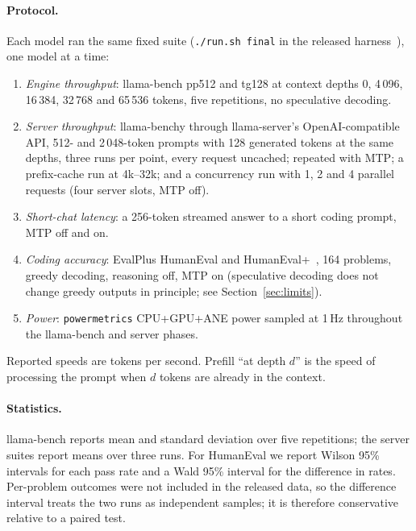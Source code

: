 \documentclass[11pt]{article}
\begin{document}
\paragraph{Protocol.}
Each model ran the same fixed suite (\texttt{./run.sh final} in the released
harness~\cite{thisrepo}), one model at a time:
\begin{enumerate}
  \item \emph{Engine throughput}: llama-bench pp512 and tg128 at context depths 0, 4\,096,
        16\,384, 32\,768 and 65\,536 tokens, five repetitions, no speculative decoding.
  \item \emph{Server throughput}: llama-benchy through llama-server's OpenAI-compatible API,
        512- and 2\,048-token prompts with 128 generated tokens at the same depths, three runs
        per point, every request uncached; repeated with MTP; a prefix-cache run at 4k--32k;
        and a concurrency run with 1, 2 and 4 parallel requests (four server slots, MTP off).
  \item \emph{Short-chat latency}: a 256-token streamed answer to a short coding prompt, MTP off
        and on.
  \item \emph{Coding accuracy}: EvalPlus HumanEval and HumanEval+~\cite{chen2021codex,liu2023evalplus},
        164 problems, greedy decoding, reasoning off, MTP on (speculative decoding does not
        change greedy outputs in principle; see Section~\ref{sec:limits}).
  \item \emph{Power}: \texttt{powermetrics} CPU+GPU+ANE power sampled at 1\,Hz throughout the
        llama-bench and server phases.
\end{enumerate}
Reported speeds are tokens per second. Prefill ``at depth $d$'' is the speed of processing
the prompt when $d$ tokens are already in the context.

\paragraph{Statistics.}
llama-bench reports mean and standard deviation over five repetitions; the server suites
report means over three runs. For HumanEval we report Wilson 95\% intervals for each pass
rate and a Wald 95\% interval for the difference in rates. Per-problem outcomes were not
included in the released data, so the difference interval treats the two runs as
independent samples; it is therefore conservative relative to a paired test.

\end{document}

